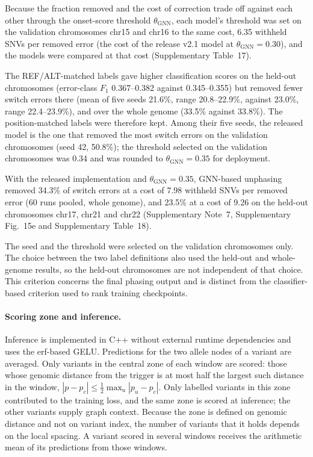 \documentclass[11pt,a4paper]{article}
\begin{document}
Because the fraction removed and the cost of correction trade off against each other through the onset-score threshold $\theta_{\mathrm{GNN}}$, each model's threshold was set on the validation chromosomes chr15 and chr16 to the same cost, 6.35 withheld SNVs per removed error (the cost of the release v2.1 model at $\theta_{\mathrm{GNN}}=0.30$), and the models were compared at that cost (Supplementary Table~17).

The REF/ALT-matched labels gave higher classification scores on the held-out chromosomes (error-class $F_1$ 0.367--0.382 against 0.345--0.355) but removed fewer switch errors there (mean of five seeds 21.6\%, range 20.8--22.9\%, against 23.0\%, range 22.4--23.9\%), and over the whole genome (33.5\% against 33.8\%). The position-matched labels were therefore kept. Among their five seeds, the released model is the one that removed the most switch errors on the validation chromosomes (seed 42, 50.8\%); the threshold selected on the validation chromosomes was 0.34 and was rounded to $\theta_{\mathrm{GNN}}=0.35$ for deployment.

With the released implementation and $\theta_{\mathrm{GNN}}=0.35$, GNN-based unphasing removed 34.3\% of switch errors at a cost of 7.98 withheld SNVs per removed error (60 runs pooled, whole genome), and 23.5\% at a cost of 9.26 on the held-out chromosomes chr17, chr21 and chr22 (Supplementary Note~7, Supplementary Fig.~15e and Supplementary Table~18).

The seed and the threshold were selected on the validation chromosomes only. The choice between the two label definitions also used the held-out and whole-genome results, so the held-out chromosomes are not independent of that choice. This criterion concerns the final phasing output and is distinct from the classifier-based criterion used to rank training checkpoints.

\paragraph{Scoring zone and inference.} Inference is implemented in C++ without external runtime dependencies and uses the erf-based GELU. Predictions for the two allele nodes of a variant are averaged. Only variants in the central zone of each window are scored: those whose genomic distance from the trigger is at most half the largest such distance in the window, $|p - p_c| \le \tfrac{1}{2}\max_u |p_u - p_c|$. Only labelled variants in this zone contributed to the training loss, and the same zone is scored at inference; the other variants supply graph context. Because the zone is defined on genomic distance and not on variant index, the number of variants that it holds depends on the local spacing. A variant scored in several windows receives the arithmetic mean of its predictions from those windows.
\end{document}
